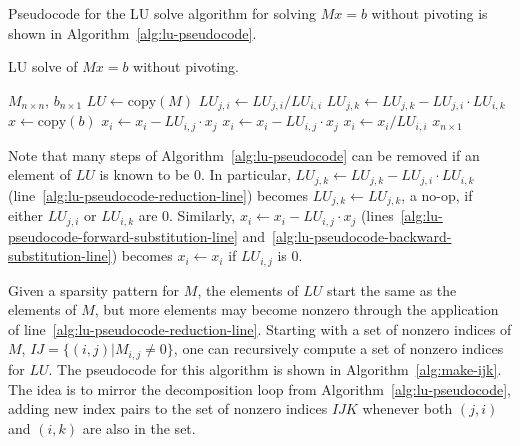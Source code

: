 Pseudocode for the LU solve algorithm for solving $Mx=b$ without pivoting is
shown in Algorithm~\ref{alg:lu-pseudocode}.~\cite{ationneeded}
\begin{algorithm}[h]
  \caption{LU solve of $Mx=b$ without pivoting.}\label{alg:lu-pseudocode}
  \begin{algorithmic}[1]
  \REQUIRE $M_{n\times n}$, $b_{n\times 1}$
  \STATE {}
  \STATE {}
  \STATE
  \STATE $LU \leftarrow \mathrm{copy}(M)$
  \STATE
          \STATE $LU_{j, i} \leftarrow LU_{j, i}/LU_{i, i}$\label{alg:lu-pseudocode-decompose-division}
              \STATE $LU_{j, k} \leftarrow LU_{j, k} - LU_{j, i}\cdot LU_{i, k}$\label{alg:lu-pseudocode-reduction-line}
          \ENDFOR
      \ENDFOR
  \ENDFOR
  \STATE
  \STATE {}
  \STATE $x \leftarrow \mathrm{copy}(b)$
  \STATE
  \STATE {}
          \STATE $x_i \leftarrow x_i - LU_{i, j}\cdot x_j$\label{alg:lu-pseudocode-forward-substitution-line}
      \ENDFOR
  \ENDFOR
  \STATE
  \STATE {}
          \STATE $x_i \leftarrow x_i -LU_{i, j}\cdot x_j$\label{alg:lu-pseudocode-backward-substitution-line}
      \ENDFOR
      \STATE $x_i \leftarrow x_i/LU_{i, i}$\label{alg:lu-pseudocode-solve-division}
  \ENDFOR
  \STATE
  \ENSURE $x_{n\times 1}$

\end{algorithmic}
\end{algorithm}
Note that many steps of Algorithm~\ref{alg:lu-pseudocode} can be removed if an
element of $LU$ is known to be 0. In particular,
$LU_{j, k} \leftarrow LU_{j, k} - LU_{j, i}\cdot LU_{i, k}$
(line~\ref{alg:lu-pseudocode-reduction-line}) becomes
$LU_{j, k} \leftarrow LU_{j, k}$, a no-op, if either $LU_{j, i}$ or
$LU_{i, k}$ are 0. Similarly, $x_i \leftarrow x_i -LU_{i, j}\cdot x_j$
(lines~\ref{alg:lu-pseudocode-forward-substitution-line}
and~\ref{alg:lu-pseudocode-backward-substitution-line}) becomes
$x_i \leftarrow x_i$ if $LU_{i,j}$ is 0.

Given a sparsity pattern for $M$, the elements of $LU$ start the same
as the elements of $M$, but more elements may become nonzero through the
application of line~\ref{alg:lu-pseudocode-reduction-line}. Starting with a
set of nonzero indices of $M$, $IJ=\{(i, j) | M_{i, j} \neq 0\}$, one can
recursively compute a set of nonzero indices for $LU$. The pseudocode for this
algorithm is shown in Algorithm~\ref{alg:make-ijk}. The idea is to mirror the
decomposition loop from Algorithm~\ref{alg:lu-pseudocode}, adding new index
pairs to the set of nonzero indices $IJK$ whenever both $(j, i)$ and $(i, k)$
are also in the set.

